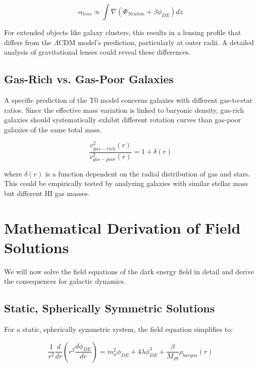 \documentclass[a4paper,12pt]{article}
\begin{document}
	\begin{equation}
		\alpha_{lens} \propto \int \nabla(\Phi_{Newton} + \beta\phi_{DE}) dz
	\end{equation}
	
	For extended objects like galaxy clusters, this results in a lensing profile that differs from the $\Lambda$CDM model’s prediction, particularly at outer radii. A detailed analysis of gravitational lenses could reveal these differences.
	
	\subsection{Gas-Rich vs. Gas-Poor Galaxies}
	
	A specific prediction of the T0 model concerns galaxies with different gas-to-star ratios. Since the effective mass variation is linked to baryonic density, gas-rich galaxies should systematically exhibit different rotation curves than gas-poor galaxies of the same total mass.
	
	\begin{equation}
		\frac{v^2_{gas-rich}(r)}{v^2_{gas-poor}(r)} = 1 + \delta(r)
	\end{equation}
	
	where $\delta(r)$ is a function dependent on the radial distribution of gas and stars. This could be empirically tested by analyzing galaxies with similar stellar mass but different HI gas masses.
	
	\section{Mathematical Derivation of Field Solutions}
	
	We will now solve the field equations of the dark energy field in detail and derive the consequences for galactic dynamics.
	
	\subsection{Static, Spherically Symmetric Solutions}
	
	For a static, spherically symmetric system, the field equation simplifies to:
	
	\begin{equation}
		\frac{1}{r^2}\frac{d}{dr}\left(r^2\frac{d\phi_{DE}}{dr}\right) = m_{\phi}^2\phi_{DE} + 4\lambda\phi_{DE}^3 + \frac{\beta}{M_{Pl}}\rho_{baryon}(r)
	\end{equation}
	
\end{document}
